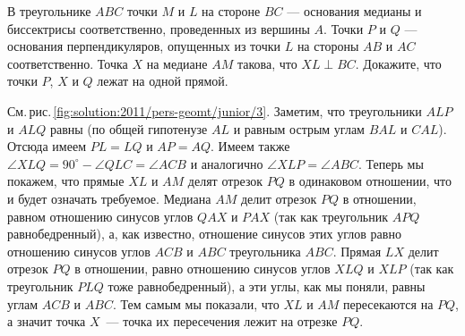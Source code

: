 \problem
В треугольнике $ABC$ точки $M$ и $L$ на стороне $BC$ --- основания медианы и
биссектрисы соответственно, проведенных из вершины $A$.
Точки $P$ и $Q$ --- основания перпендикуляров, опущенных из точки $L$ на
стороны $AB$ и $AC$ соответственно.
Точка $X$ на медиане $AM$ такова, что $XL \perp BC$.
Докажите, что точки $P$, $X$ и $Q$ лежат на одной прямой. 

%
\label{solution:2011/pers-geomt/junior/3}%
См.\,рис.\,\ref{fig:solution:2011/pers-geomt/junior/3}.
Заметим, что треугольники $ALP$ и $ALQ$ равны
(по общей гипотенузе $AL$ и равным острым углам $BAL$ и $CAL$).
Отсюда имеем $PL = LQ$ и $AP = AQ$.
Имеем также
$\angle XLQ = 90^\circ - \angle QLC = \angle ACB$
и аналогично $\angle XLP = \angle ABC$.
Теперь мы покажем, что прямые $XL$ и $AM$ делят отрезок $PQ$ в одинаковом
отношении, что и будет означать требуемое.
Медиана $AM$ делит отрезок $PQ$ в отношении, равном отношению синусов углов
$QAX$ и $PAX$ (так как треугольник $APQ$ равнобедренный), а, как известно,
отношение синусов этих углов равно отношению синусов углов $ACB$ и $ABC$
треугольника $ABC$.
Прямая $LX$ делит отрезок $PQ$ в отношении, равно отношению синусов углов $XLQ$
и $XLP$ (так как треугольник $PLQ$ тоже равнобедренный), а эти углы, как мы
поняли, равны углам $ACB$ и $ABC$.
Тем самым мы показали, что $XL$ и $AM$ пересекаются на $PQ$, а значит точка
$X$~--- точка их пересечения лежит на отрезке $PQ$.

\endproblem
